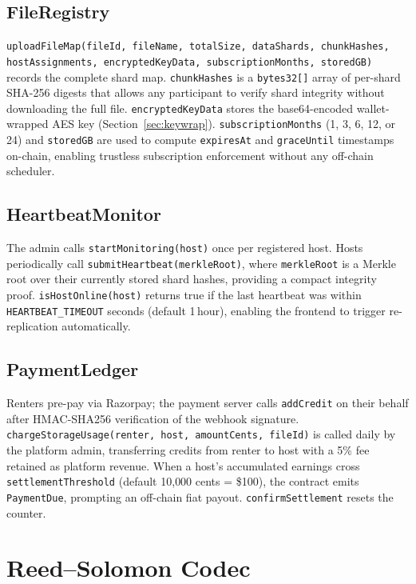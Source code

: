 \documentclass[journal]{IEEEtran}
\begin{document}
\subsection{FileRegistry}
\texttt{uploadFileMap(fileId, fileName, totalSize, dataShards,
chunkHashes, hostAssignments, encryptedKeyData, subscriptionMonths, storedGB)}
records the complete shard
map. \texttt{chunkHashes} is a \texttt{bytes32[]} array of per-shard SHA-256
digests that allows any participant to verify shard integrity without
downloading the full file. \texttt{encryptedKeyData} stores the
base64-encoded wallet-wrapped AES key (Section~\ref{sec:keywrap}).
\texttt{subscriptionMonths} (1, 3, 6, 12, or 24) and \texttt{storedGB}
are used to compute \texttt{expiresAt} and \texttt{graceUntil} timestamps
on-chain, enabling trustless subscription enforcement without any
off-chain scheduler.

\subsection{HeartbeatMonitor}
The admin calls \texttt{startMonitoring(host)} once per registered host.
Hosts periodically call \texttt{submitHeartbeat(merkleRoot)}, where
\texttt{merkleRoot} is a Merkle root over their currently stored shard
hashes, providing a compact integrity proof.
%
\texttt{isHostOnline(host)} returns true if the last heartbeat was within
\texttt{HEARTBEAT\_TIMEOUT} seconds (default 1\,hour), enabling the
frontend to trigger re-replication automatically.

\subsection{PaymentLedger}
Renters pre-pay via Razorpay; the payment server calls \texttt{addCredit}
on their behalf after HMAC-SHA256 verification of the webhook signature.
\texttt{chargeStorageUsage(renter, host, amountCents, fileId)} is called
daily by the platform admin, transferring credits from renter to host with
a 5\% fee retained as platform revenue.
%
When a host's accumulated earnings cross \texttt{settlementThreshold}
(default 10{,}000 cents = \$100), the contract emits \texttt{PaymentDue},
prompting an off-chain fiat payout.
%
\texttt{confirmSettlement} resets the counter.

\section{Reed--Solomon Codec}
\label{sec:rs}
\end{document}
